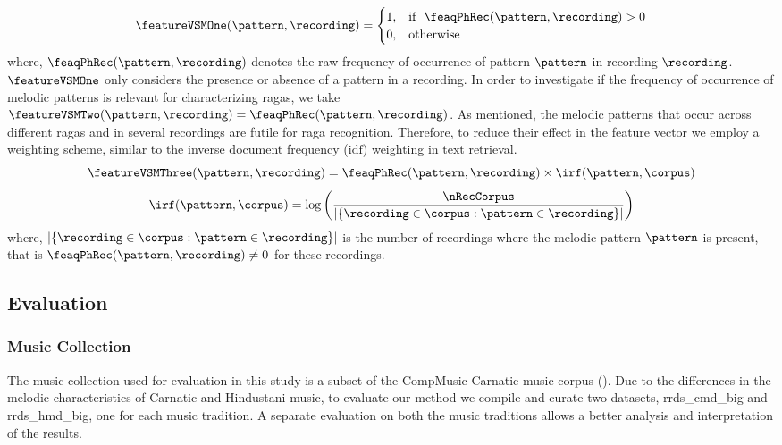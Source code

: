 \begin{equation}
\featureVSMOne(\pattern,\recording)= 
\begin{cases}
1				,& \text{if}~~\feaqPhRec(\pattern,\recording) > 0\\
0,              & \text{otherwise}
\end{cases}
\end{equation}
where, $\feaqPhRec(\pattern,\recording)$ denotes the raw frequency of occurrence of pattern $\pattern$ in recording $\recording$. $\featureVSMOne$ only considers the presence or absence of a pattern in a recording. In order to investigate if the frequency of occurrence of melodic patterns is relevant for characterizing \glspl{raga}, we take $\featureVSMTwo(\pattern,\recording) = \feaqPhRec(\pattern,\recording)$. As mentioned, the melodic patterns that occur across different \glspl{raga} and in several recordings are futile for \gls{raga} recognition. Therefore, to reduce their effect in the feature vector we employ a weighting scheme, similar to the inverse document frequency ($\mathrm{idf}$) weighting in text retrieval.
\begin{equation}
\featureVSMThree(\pattern,\recording) = \feaqPhRec(\pattern,\recording) \times \irf(\pattern,\corpus)
\end{equation}
\begin{equation}
\irf(\pattern,\corpus) = \log \left( \frac{\nRecCorpus}{ |\lbrace \recording \in \corpus: \pattern \in \recording \rbrace|} \right)
\end{equation}
where, $|\lbrace \recording \in \corpus: \pattern \in \recording \rbrace|$ is the number of recordings where the melodic pattern $\pattern$ is present, that is $\feaqPhRec(\pattern,\recording)\neq 0$ for these recordings. 

\subsection{Evaluation}
\label{sec:raga_rec_pattern_evaluation}

\subsubsection{Music Collection}
\label{sec:raga_rec_pattern_music_collection}

The music collection used for evaluation in this study is a subset of the CompMusic Carnatic music corpus (). Due to the differences in the melodic characteristics of Carnatic and Hindustani music, to evaluate our method we compile and curate two datasets, \acrshort{rrds_cmd_big} and \acrshort{rrds_hmd_big}, one for each music tradition. A separate evaluation on both the music traditions allows a better analysis and interpretation of the results.

